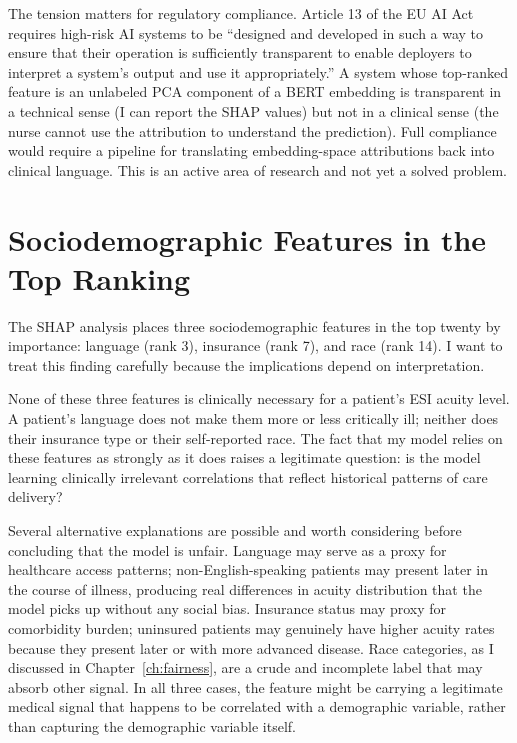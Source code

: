 The tension matters for regulatory compliance. Article 13 of the EU AI Act requires high-risk AI systems to be ``designed and developed in such a way to ensure that their operation is sufficiently transparent to enable deployers to interpret a system's output and use it appropriately.'' A system whose top-ranked feature is an unlabeled PCA component of a BERT embedding is transparent in a technical sense (I can report the SHAP values) but not in a clinical sense (the nurse cannot use the attribution to understand the prediction). Full compliance would require a pipeline for translating embedding-space attributions back into clinical language. This is an active area of research and not yet a solved problem.

\section{Sociodemographic Features in the Top Ranking}

The SHAP analysis places three sociodemographic features in the top twenty by importance: language (rank 3), insurance (rank 7), and race (rank 14). I want to treat this finding carefully because the implications depend on interpretation.

None of these three features is clinically necessary for a patient's ESI acuity level. A patient's language does not make them more or less critically ill; neither does their insurance type or their self-reported race. The fact that my model relies on these features as strongly as it does raises a legitimate question: is the model learning clinically irrelevant correlations that reflect historical patterns of care delivery?

Several alternative explanations are possible and worth considering before concluding that the model is unfair. Language may serve as a proxy for healthcare access patterns; non-English-speaking patients may present later in the course of illness, producing real differences in acuity distribution that the model picks up without any social bias. Insurance status may proxy for comorbidity burden; uninsured patients may genuinely have higher acuity rates because they present later or with more advanced disease. Race categories, as I discussed in Chapter~\ref{ch:fairness}, are a crude and incomplete label that may absorb other signal. In all three cases, the feature might be carrying a legitimate medical signal that happens to be correlated with a demographic variable, rather than capturing the demographic variable itself.

